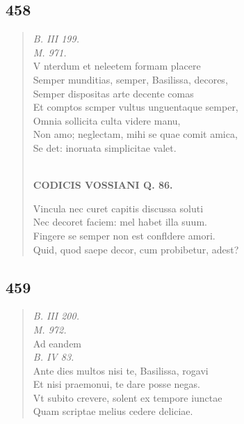 \documentclass[11pt, a4paper]{report}
\begin{document}
            \subsection*{458}
      \begin{verse}
      \textit{B. III 199.} \\ \textit{M. 971.} \\ V nterdum et neleetem formam placere \\ Semper munditias, semper, Basilissa, decores, \\ Semper dispositas arte decente comas \\ Et comptos scmper vultus unguentaque semper, \\ Omnia sollicita culta videre manu, \\ Non amo; neglectam, mihi se quae comit amica, \\ Se det: inoruata simplicitae valet. \\ 
        ﻿\pagebreak 
     \marginpar{[339]} \begin{center} \textbf{CODICIS VOSSIANI Q. 86.} \end{center}Vincula nec curet capitis discussa soluti \\ Nec decoret faciem: mel habet illa suum. \\ Fingere se semper non est confldere amori. \\ Quid, quod saepe decor, cum probibetur, adest? \\ 
      \end{verse}
  
            \subsection*{459}
      \begin{verse}
      \textit{B. III 200.} \\ \textit{M. 972.} \\  \lbrack Ad eandem \rbrack  \\ \textit{B. IV 83.} \\ Ante dies multos nisi te, Basilissa, rogavi \\ Et nisi praemonui, te dare posse negas. \\ Vt subito crevere, solent ex tempore iunctae \\ Quam scriptae melius cedere deliciae. \\ 
      \end{verse}
  
\end{document}
